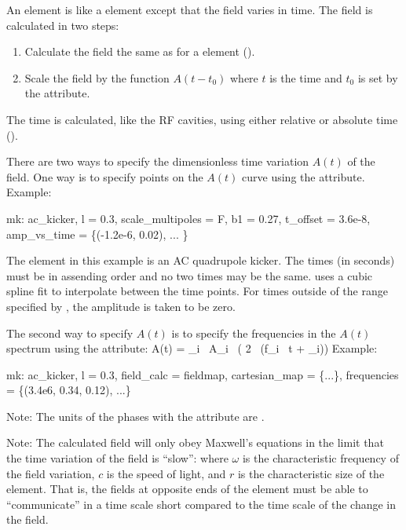 An  element is like a  element except that the field varies in time. The
field is calculated in two steps:
\begin{enumerate}
\item Calculate the field the same as for a  element ().
\item Scale the field by the function $A(t-t_0)$ where $t$ is the time and $t_0$ is set
by the  attribute. 
\end{enumerate}
The time is calculated, like the RF cavities, using either relative or absolute time ().

There are two ways to specify the dimensionless time variation $A(t)$ of the field. One way is to
specify points on the $A(t)$ curve using the 
attribute. Example:
\begin{example}
  mk: ac_kicker, l = 0.3, scale_multipoles = F, b1 = 0.27, t_offset = 3.6e-8,
          amp_vs_time = \{(-1.2e-6, 0.02), ... \} 
\end{example}
The element in this example is an AC quadrupole kicker. The times (in seconds) must be in assending
order and no two times may be the same. \bmad uses a cubic spline fit
to interpolate between the time points. For times outside of the range specified by
, the amplitude is taken to be zero.

The second way to specify $A(t)$ is to specify the frequencies in the $A(t)$ spectrum using the
 attribute:
\Begineq
  A(t) = \sum_i \, A_i \, \cos( 2 \, \pi (f_i \, t + \phi_i))
\Endeq
Example:
\begin{example}
  mk: ac_kicker, l = 0.3, field_calc = fieldmap, cartesian_map = \{...\},
          frequencies = \{(3.4e6, 0.34, 0.12), ...\}
\end{example}
Note: The units of the phases  with the  attribute are .

Note: The calculated field will only obey Maxwell's equations in the limit that the time variation
of the field is ``slow'':
\Begineq
  \omega \ll {}
\Endeq
where $\omega$ is the characteristic frequency of the field variation, $c$ is the speed of light,
and $r$ is the characteristic size of the  element. That is, the fields at opposite ends
of the element must be able to ``communicate'' in a time scale short compared to the time scale of
the change in the field.

